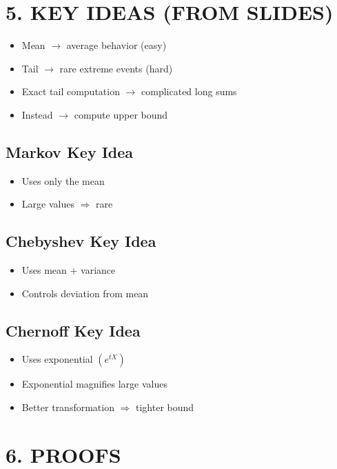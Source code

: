 \documentclass[12pt]{article}
\begin{document}
\section*{5. KEY IDEAS (FROM SLIDES)}

\begin{itemize}
\item Mean $\rightarrow$ average behavior (easy)
\item Tail $\rightarrow$ rare extreme events (hard)
\item Exact tail computation $\rightarrow$ complicated long sums
\item Instead $\rightarrow$ compute upper bound
\end{itemize}

\subsection*{Markov Key Idea}

\begin{itemize}
\item Uses only the mean
\item Large values $\Rightarrow$ rare
\end{itemize}

\subsection*{Chebyshev Key Idea}

\begin{itemize}
\item Uses mean + variance
\item Controls deviation from mean
\end{itemize}

\subsection*{Chernoff Key Idea}

\begin{itemize}
\item Uses exponential $(e^{tX})$
\item Exponential magnifies large values
\item Better transformation $\Rightarrow$ tighter bound
\end{itemize}

\section*{6. PROOFS}
\end{document}
